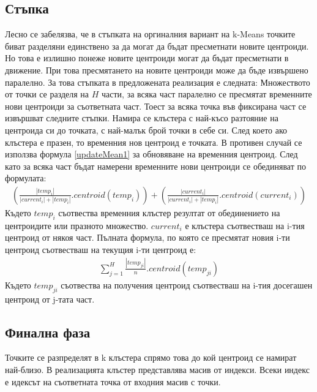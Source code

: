 \documentclass[a4paper, 12pt]{article}
\begin{document}
\subsection{Стъпка}
Лесно се забелязва, че в стъпката на оргиналния вариант на k-Means точките биват разделяни
единствено за да могат да бъдат пресметнати новите центроиди.
Но това е излишно понеже новите центроиди могат да бъдат пресметнати в движение.
При това пресмятането на новите центроиди може да бъде извършено паралелно.
За това стъпката в предложената реализация е следната:
Множеството от точки се разделя на \(H\) части,
за всяка част паралелно се пресмятат временните нови центроиди за съответната част.
Тоест за всяка точка във фиксирана част се извършват следните стъпки.
Намира се клъстера с най-късо разтояние на центроида си до точката, с най-малък брой точки в себе си.
След което ако клъстера е празен, то временния нов центроид е точката.
В противен случай се използва формула \ref{updateMean1} за обновяване на временния центроид.
След като за всяка част бъдат намерени временните нови центроиди се обединяват по формулата:
\begin{align}
    \left(\displaystyle\frac{|temp_i|}{|current_i| + |temp_i|} . centroid(temp_i)\right) + \left(\displaystyle\frac{|current_i|}{|current_i| + |temp_i|} . centroid(current_i)\right) \label{updateMeanTmp}
\end{align}
Където \(temp_i\) съотвества временния клъстер резултат от обединението на центроидите или празното множество.
\(current_i\) е клъстера съотвестваш на i-тия центроид от някоя част.
Пълната формула, по която се пресмятат новия i-ти центроид съотвестваш на текущия i-ти центроид е:
\begin{align}
    \displaystyle\sum_{j = 1}^H \displaystyle\frac{|temp_{ji}|}{n} . centroid(temp_{ji})\label{newMeans}
\end{align}
Където \(temp_{ji}\) съотвества на получения центроид съотвестваш на i-тия досегашен центроид от j-тата част.
\subsection{Финална фаза}
Точките се разпределят в k клъстера спрямо това до кой центроид се намират най-близо.
В реализацията клъстер представлява масив от индекси.
Всеки индекс е идексът на съответната точка от входния масив с точки.
\end{document}
